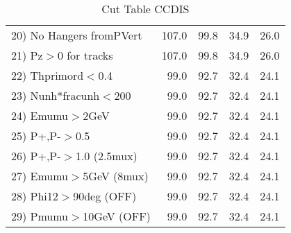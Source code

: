 \begin{table}[h!]
\begin{tabular}{||l||r|r|r|r||}
 20) No Hangers fromPVert &       107.0 &        99.8 &        34.9 &        26.0 \\
 21) Pz$>$0 for tracks    &       107.0 &        99.8 &        34.9 &        26.0 \\
 22) Thprimord$<$0.4      &        99.0 &        92.7 &        32.4 &        24.1 \\
 23) Nunh*fracunh$<$200   &        99.0 &        92.7 &        32.4 &        24.1 \\
 24) Emumu$>$2GeV         &        99.0 &        92.7 &        32.4 &        24.1 \\
 25) P+,P-$>$0.5          &        99.0 &        92.7 &        32.4 &        24.1 \\
 26) P+,P-$>$1.0 (2.5mux) &        99.0 &        92.7 &        32.4 &        24.1 \\
 27) Emumu$>$5GeV  (8mux) &        99.0 &        92.7 &        32.4 &        24.1 \\
 28) Phi12$>$90deg  (OFF) &        99.0 &        92.7 &        32.4 &        24.1 \\
 29) Pmumu$>$10GeV  (OFF) &        99.0 &        92.7 &        32.4 &        24.1 \\
 \hline
 \hline
 \end{tabular}
 \caption{Cut Table  CCDIS  }
 \label{tab-cut_ccdis}
 \end{table}
